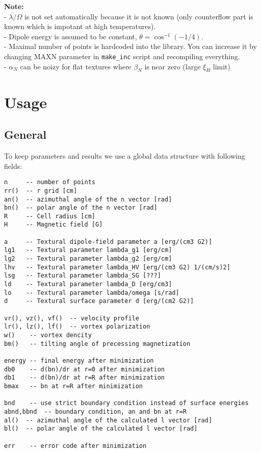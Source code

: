 \documentclass[a4paper]{article}
\begin{document}
{\bf Note:}\\
- $\lambda/\Omega$ is not set automatically because it is not known
  (only counterflow part is known which is impotant at high temperatures).\\
- Dipole energy is assumed to be constant, $\theta=\cos^{-1}(-1/4)$.\\
- Maximal number of points is hardcoded into the library. You can
  increase it by changing MAXN parameter in {\tt make\_inc} script and
  recompiling everything.\\
- $\alpha_N$ can be noizy for flat textures where $\beta_N$ is near zero
  (large $\xi_H$ limit)\\

\eject
\section*{Usage}

\subsection*{General}
To keep parameters and results we use a global data structure with following fields:

\begin{verbatim}
n     -- number of points
rr()  -- r grid [cm]
an()  -- azimuthal angle of the n vector [rad]
bn()  -- polar angle of the n vector [rad]
R     -- Cell radius [cm]
H     -- Magnetic field [G]

a     -- Textural dipole-field parameter a [erg/(cm3 G2)]
lg1   -- Textural parameter lambda_g1 [erg/cm]
lg2   -- Textural parameter lambda_g2 [erg/cm]
lhv   -- Textural parameter lambda_HV [erg/(cm3 G2) 1/(cm/s)2]
lsg   -- Textural parameter lambda_SG [???]
ld    -- Textural parameter lambda_D [erg/cm3]
lo    -- Textural parameter lambda/omega [s/rad]
d     -- Textural surface parameter d [erg/(cm2 G2)]

vr(), vz(), vf()  -- velocity profile
lr(), lz(), lf()  -- vortex polarization
w()    -- vortex dencity
bm()   -- tilting angle of precessing magnetization

energy -- final energy after minimization
db0    -- d(bn)/dr at r=0 after minimization
db1    -- d(bn)/dr at r=R after minimization
bmax   -- bn at r=R after minimization

bnd    -- use strict boundary condition instead of surface energies
abnd,bbnd  -- boundary condition, an and bn at r=R
al()  -- azimuthal angle of the calculated l vector [rad]
bl()  -- polar angle of the calculated l vector [rad]

err    -- error code after minimization
\end{verbatim}
\end{document}
